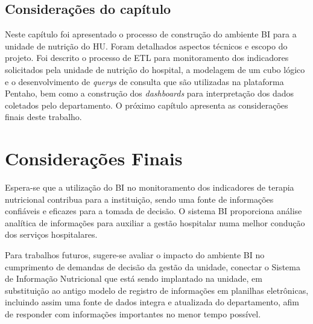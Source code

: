 \section{Considerações do capítulo}
Neste capítulo foi apresentado o processo de construção do ambiente BI para a unidade de nutrição do HU. Foram detalhados aspectos técnicos e escopo do projeto. Foi descrito o processo de ETL para monitoramento dos indicadores solicitados pela unidade de nutrição do hospital, a modelagem de um cubo lógico e o desenvolvimento de \textit{querys} de consulta que são utilizadas na plataforma Pentaho, bem como a construção dos \textit{dashboards} para interpretação dos dados coletados pelo departamento. O próximo capítulo apresenta as considerações finais deste trabalho.



\chapter{Considerações Finais}
Espera-se que a utilização do BI no monitoramento dos indicadores de terapia nutricional contribua para a instituição, sendo uma fonte de informações confiáveis e eficazes para a tomada de decisão. O sistema BI proporciona análise analítica de informações para auxiliar a gestão hospitalar numa melhor condução dos serviços hospitalares.

Para trabalhos futuros, sugere-se avaliar o impacto do ambiente BI no cumprimento de demandas de decisão da gestão da unidade, conectar o Sistema de Informação Nutricional que está sendo implantado na unidade, em substituição ao antigo modelo de registro de informações em planilhas eletrônicas, incluindo assim uma fonte de dados integra e atualizada do departamento, afim de responder com informações importantes no menor tempo possível.
